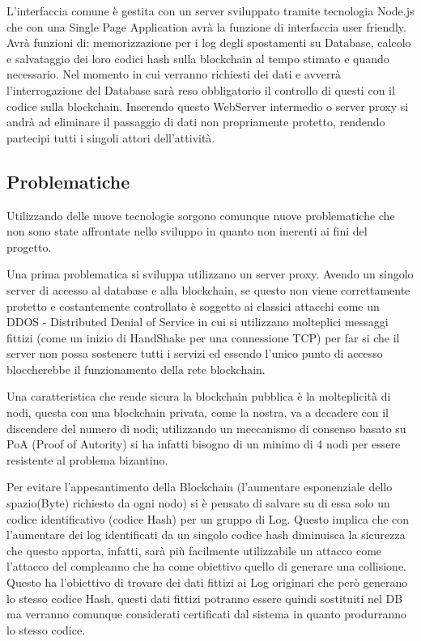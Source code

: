 \documentclass[11pt,a4paper,titlepage,twoside,openright]{report}
\begin{document}
L'interfaccia comune è gestita con un server sviluppato tramite tecnologia Node.js che con una Single Page Application avrà la funzione di interfaccia user friendly. Avrà funzioni di: memorizzazione per i log degli spostamenti su Database, calcolo e salvataggio dei loro codici hash sulla blockchain al tempo stimato e quando necessario. Nel momento in cui verranno richiesti dei dati e avverrà l'interrogazione del Database sarà reso obbligatorio il controllo di questi con il codice sulla blockchain. Inserendo questo WebServer intermedio o server proxy si andrà ad eliminare il passaggio di dati non propriamente protetto, rendendo partecipi tutti i singoli attori dell'attività.

\subsection{Problematiche}
Utilizzando delle nuove tecnologie sorgono comunque nuove problematiche che non sono state affrontate nello sviluppo in quanto non inerenti ai fini del progetto.

Una prima problematica si sviluppa utilizzano un server proxy. Avendo un singolo server di accesso al database e alla blockchain, se questo non viene correttamente protetto e costantemente controllato è soggetto ai classici attacchi come un DDOS - Distributed Denial of Service in cui si utilizzano molteplici messaggi fittizi (come un inizio di HandShake per una connessione TCP) per far si che il server non possa sostenere tutti i servizi ed essendo l'unico punto di accesso bloccherebbe il funzionamento della rete blockchain.

Una caratteristica che rende sicura la blockchain pubblica è la molteplicità di nodi, questa con una blockchain privata, come la nostra, va a decadere con il discendere  del numero di nodi; utilizzando un meccanismo di consenso basato su PoA (Proof of Autority) si ha infatti bisogno di un minimo di 4 nodi per essere resistente al problema bizantino.

Per evitare l'appesantimento della Blockchain (l'aumentare esponenziale dello spazio(Byte) richiesto da ogni nodo) si è pensato di salvare su di essa solo un codice identificativo (codice Hash) per un gruppo di Log. Questo implica che con l'aumentare dei log identificati da un singolo codice hash diminuisca la sicurezza che questo apporta, infatti, sarà più facilmente utilizzabile un attacco come l'attacco del compleanno che ha come obiettivo quello di generare una collisione. Questo ha l'obiettivo di trovare dei dati fittizi ai Log originari che però generano lo stesso codice Hash, questi dati fittizi potranno essere quindi sostituiti nel DB ma verranno comunque considerati certificati dal sistema in quanto produrranno lo stesso codice.
\end{document}
